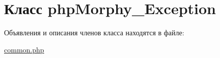 \hypertarget{classphpMorphy__Exception}{
\section{Класс phpMorphy\_\-Exception}
\label{classphpMorphy__Exception}
}


Объявления и описания членов класса находятся в файле:\begin{DoxyCompactItemize}
\item 
\hyperlink{common_8php}{common.php}\end{DoxyCompactItemize}
